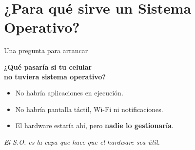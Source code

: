 \documentclass[xcolor=svgnames]{beamer}
\begin{document}
\section{¿Para qué sirve un Sistema Operativo?}

\begin{frame}{Una pregunta para arrancar}
  \begin{center}
    \Large
    \textbf{¿Qué pasaría si tu celular\\no tuviera sistema operativo?}
  \end{center}
  \vspace{0.5cm}
  \begin{itemize}
    \item No habría aplicaciones en ejecución.
    \item No habría pantalla táctil, Wi-Fi ni notificaciones.
    \item El hardware estaría ahí, pero \textbf{nadie lo gestionaría}.
  \end{itemize}
  \vspace{0.4cm}
  \begin{center}
    \textit{El S.O. es la capa que hace que el hardware sea útil.}
  \end{center}
\end{frame}
\end{document}
